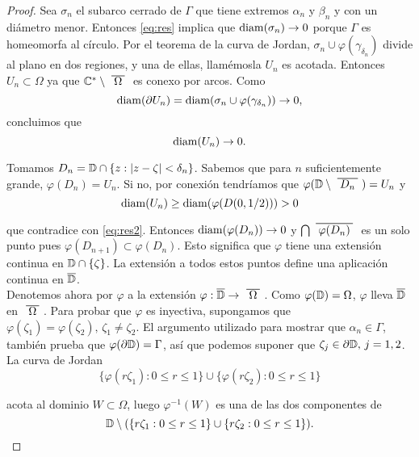 \begin{proof}
    Sea $\sigma_n$ el subarco cerrado de $\Gamma$ que tiene extremos $\alpha_n$ y $\beta_n$ y con un diámetro menor. Entonces \eqref{eq:res} implica que $\operatorname{diam}(\sigma_n) \to 0$ porque $\Gamma$ es homeomorfa al círculo. Por el teorema de la curva de Jordan, $\sigma_n \cup \varphi(\gamma_{\delta_n})$ divide al plano en dos regiones, y una de ellas, llamémosla $U_n$ es acotada. Entonces $U_n \subset \Omega$ ya que $\complex^* \setminus \xbar{\Omega}$ es conexo por arcos. Como
    \begin{equation}
        \operatorname{diam}(\partial U_n) = \operatorname{diam}(\sigma_n \cup \varphi(\gamma_{\delta_n})) \to 0,
    \end{equation}
    concluimos que
    \begin{equation}
        \label{eq:res2}
        \operatorname{diam}(U_n) \to 0.
    \end{equation}

    Tomamos $D_n = \mathbb{D} \cap \{ z: \left\lvert z - \zeta\right\rvert < \delta_n \}$. Sabemos que para $n$ suficientemente grande, $\varphi(D_n) = U_n$. Si no, por conexión tendríamos que $\varphi(\disk \setminus \xbar{D_n}) = U_n$ y
    \begin{equation*}
        \operatorname{diam} (U_n) \geq \operatorname{diam}(\varphi(D(0, 1/2))) > 0
    \end{equation*}

    que contradice con \eqref{eq:res2}. Entonces $\operatorname{diam}(\varphi(D_n)) \to 0$ y $\bigcap \xbar{\varphi(D_n)}$ es un solo punto pues $\varphi(D_{n+1}) \subset \varphi(D_n)$. Esto significa que $\varphi$ tiene una extensión continua en $\mathbb{D} \cap \{ \zeta \}$. La extensión a todos estos puntos define una aplicación continua en $\overline{\mathbb{D}}$. \\

    Denotemos ahora por $\varphi$ a la extensión $\varphi : \closedisk \to \xbar{\Omega}$. Como $\varphi(\mathbb{D}) = \Omega$, $\varphi$ lleva  $\overline{\mathbb{D}}$ en $\xbar{\Omega}$. Para probar que $\varphi$ es inyectiva, supongamos que $\varphi(\zeta_1) = \varphi(\zeta_2), \, \zeta_1 \not = \zeta_2$. El argumento utilizado para mostrar que $\alpha_n \in \Gamma$, también prueba que $\varphi (\partial \mathbb{D}) = \Gamma$, así que podemos suponer que $\zeta_j \in \partial \mathbb{D}, \, j=1, 2$. La curva de Jordan
    \begin{equation*}
        \{\varphi (r \zeta_1) : 0 \leq r \leq 1\} \cup \{\varphi (r \zeta_2) : 0 \leq r \leq 1\}
    \end{equation*}

    acota al dominio $W \subset \Omega$, luego $\varphi ^{-1} (W)$ es una de las dos componentes de
    \begin{equation*}
        \mathbb{D} \setminus ( \{ r \zeta_1 : 0 \leq r \leq 1\} \cup \{ r \zeta_2 : 0 \leq r \leq 1\}).
    \end{equation*}


\end{proof}
